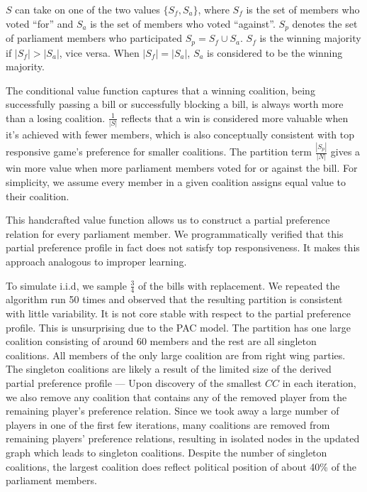 \documentclass[letterpaper]{article} %
\newcommand{\CC}{\mathit{CC}}
\theoremstyle{definition}
\begin{document}
$S$ can take on one of the two values $\{S_f, S_a\}$, where $S_f$ is the set of members who voted ``for'' and $S_a$ is the set of members who voted ``against''. $S_p$ denotes the set of parliament members who participated $S_p = S_f \cup S_a$. $S_f$ is the winning majority if $|S_f| > |S_a|$, vice versa. When $|S_f| = |S_a|$, $S_a$ is considered to be the winning majority.

The conditional value function captures that a winning coalition, being successfully passing a bill or successfully blocking a bill, is always worth more than a losing coalition. $\frac{1}{|S|}$ reflects that a win is considered more valuable when it's achieved with fewer members, which is also conceptually consistent with top responsive game's preference for smaller coalitions. The partition term $\frac{|S_p|}{|N|}$ gives a win more value when more parliament members voted for or against the bill. For simplicity, we assume every member in a given coalition assigns equal value to their coalition.

This handcrafted value function allows us to construct a partial preference relation for every parliament member. We programmatically verified that this partial preference profile in fact does not satisfy top responsiveness. It makes this approach analogous to improper learning.

To simulate i.i.d, we sample $\frac{3}{4}$ of the bills with replacement. We repeated the algorithm run 50 times and observed that the resulting partition is consistent with little variability. It is not core stable with respect to the partial preference profile. This is unsurprising due to the PAC model. The partition has one large coalition consisting of around 60 members and the rest are all singleton coalitions. All members of the only large coalition are from right wing parties. The singleton coalitions are likely a result of the limited size of the derived partial preference profile --- Upon discovery of the smallest $\CC$ in each iteration, we also remove any coalition that contains any of the removed player from the remaining player's preference relation. Since we took away a large number of players in one of the first few iterations, many coalitions are removed from remaining players' preference relations, resulting in isolated nodes in the updated graph which leads to singleton coalitions. Despite the number of singleton coalitions, the largest coalition does reflect political position of about 40\% of the parliament members.
\end{document}
